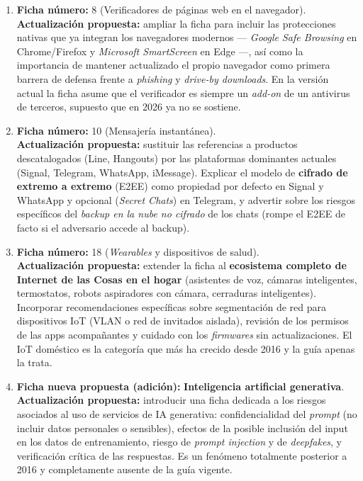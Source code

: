 \begin{enumerate}[leftmargin=*]
    \item \textbf{Ficha número:} 8 (Verificadores de páginas web en el navegador). \\
    \textbf{Actualización propuesta:} ampliar la ficha para incluir las protecciones nativas que ya integran los navegadores modernos --- \textit{Google Safe Browsing} en Chrome/Firefox y \textit{Microsoft SmartScreen} en Edge ---, así como la importancia de mantener actualizado el propio navegador como primera barrera de defensa frente a \textit{phishing} y \textit{drive-by downloads}. En la versión actual la ficha asume que el verificador es siempre un \textit{add-on} de un antivirus de terceros, supuesto que en 2026 ya no se sostiene.

    \item \textbf{Ficha número:} 10 (Mensajería instantánea). \\
    \textbf{Actualización propuesta:} sustituir las referencias a productos descatalogados (Line, Hangouts) por las plataformas dominantes actuales (Signal, Telegram, WhatsApp, iMessage). Explicar el modelo de \textbf{cifrado de extremo a extremo} (E2EE) como propiedad por defecto en Signal y WhatsApp y opcional (\textit{Secret Chats}) en Telegram, y advertir sobre los riesgos específicos del \textit{backup en la nube no cifrado} de los chats (rompe el E2EE de facto si el adversario accede al backup).

    \item \textbf{Ficha número:} 18 (\textit{Wearables} y dispositivos de salud). \\
    \textbf{Actualización propuesta:} extender la ficha al \textbf{ecosistema completo de Internet de las Cosas en el hogar} (asistentes de voz, cámaras inteligentes, termostatos, robots aspiradores con cámara, cerraduras inteligentes). Incorporar recomendaciones específicas sobre segmentación de red para dispositivos IoT (VLAN o red de invitados aislada), revisión de los permisos de las apps acompañantes y cuidado con los \textit{firmwares} sin actualizaciones. El IoT doméstico es la categoría que más ha crecido desde 2016 y la guía apenas la trata.

    \item \textbf{Ficha nueva propuesta (adición):} \textbf{Inteligencia artificial generativa}. \\
    \textbf{Actualización propuesta:} introducir una ficha dedicada a los riesgos asociados al uso de servicios de IA generativa: confidencialidad del \textit{prompt} (no incluir datos personales o sensibles), efectos de la posible inclusión del input en los datos de entrenamiento, riesgo de \textit{prompt injection} y de \textit{deepfakes}, y verificación crítica de las respuestas. Es un fenómeno totalmente posterior a 2016 y completamente ausente de la guía vigente.


\end{enumerate}
